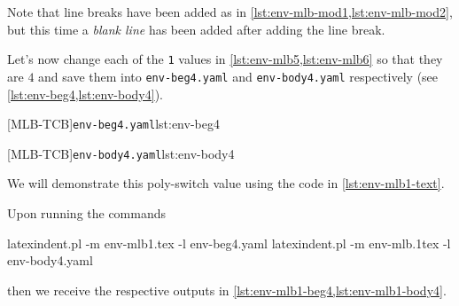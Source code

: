 		\begin{widepage}
			\begin{minipage}{.56\linewidth}
			\end{minipage}
			\hfill
			\begin{minipage}{.43\linewidth}
			\end{minipage}
		\end{widepage}

		Note that line breaks have been added as in \cref{lst:env-mlb-mod1,lst:env-mlb-mod2}, but
		this time a \emph{blank line} has been added after adding the line break.

		Let's now change%
		 each of the \texttt{1} values in
		\cref{lst:env-mlb5,lst:env-mlb6} so that they are $4$ and save them into
		\texttt{env-beg4.yaml} and \texttt{env-body4.yaml} respectively (see
		\cref{lst:env-beg4,lst:env-body4}).

		\begin{minipage}{.45\textwidth}
			{\texttt{env-beg4.yaml}}{lst:env-beg4}
		\end{minipage}
		\hfill
		\begin{minipage}{.45\textwidth}
			{\texttt{env-body4.yaml}}{lst:env-body4}
		\end{minipage}

		We will demonstrate this poly-switch value using the code in \cref{lst:env-mlb1-text}.


		Upon running the commands
		\begin{commandshell}
latexindent.pl -m env-mlb1.tex -l env-beg4.yaml
latexindent.pl -m env-mlb.1tex -l env-body4.yaml
\end{commandshell}

		then we receive the respective outputs in \cref{lst:env-mlb1-beg4,lst:env-mlb1-body4}.

